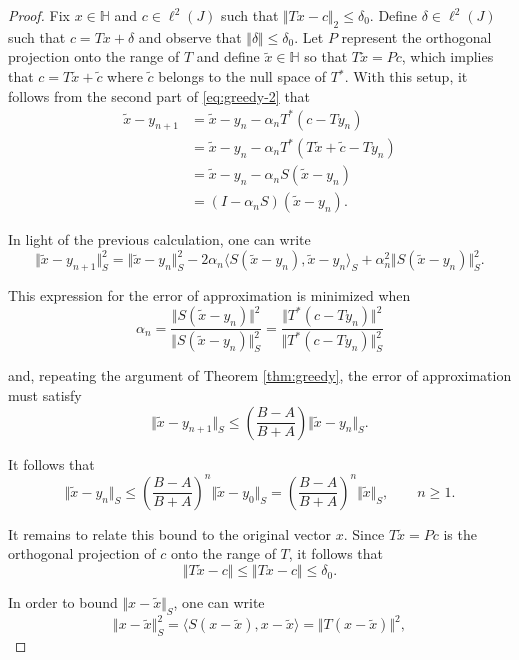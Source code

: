 \documentclass[10pt,a4paper]{amsart}
\begin{document}
\begin{proof}
Fix $x\in \mathbb{H}$ and $c\in \ell^{2}(J)$ such that $\Vert Tx-c\Vert_{2} \le \delta_{0}$.  Define $\delta \in \ell^{2}(J)$ such that $c = Tx + \delta$ and observe that $\Vert \delta\Vert \le \delta_{0}$.  Let $P$ represent the orthogonal projection onto the range of $T$ and define $\tilde{x} \in \mathbb{H}$ so that $T\tilde{x}=Pc$, which implies that $c = T\tilde{x} + \tilde{c}$ where $\tilde{c}$ belongs to the null space of $T{^*}$.  With this setup, it follows from the second part of \eqref{eq:greedy-2} that
$$ \begin{aligned} 
    \tilde{x} - y_{n+1} &= \tilde{x} - y_{n} - \alpha_{n} T^{*}(c-T y_{n}) \\
                        &= \tilde{x} - y_{n} - \alpha_{n} T^{*}(T\tilde{x} + \tilde{c} - T y_{n}) \\
                        &= \tilde{x} - y_{n} - \alpha_{n} S(\tilde{x}-y_{n}) \\
                        &= (I-\alpha_{n}S) (\tilde{x}-y_{n}). 
    \end{aligned} $$

\noindent
In light of the previous calculation, one can write
$$ \Vert \tilde{x}-y_{n+1} \Vert_{S}^{2} = \Vert \tilde{x}-y_{n} \Vert_{S}^{2} - 2\alpha_{n} \langle S(\tilde{x}-y_{n}),\tilde{x}-y_{n}\rangle_{S} + \alpha_{n}^{2} \Vert S(\tilde{x}-y_{n}) \Vert_{S}^{2}. $$

\noindent
This expression for the error of approximation is minimized when
$$ \alpha_{n} = \frac{\Vert S(\tilde{x}-y_{n})\Vert^{2}}{\Vert S(\tilde{x}-y_{n})\Vert_{S}^{2}} = \frac{\Vert T^{*}(c-Ty_{n})\Vert^{2}}{\Vert T^{*}(c-Ty_{n})\Vert_{S}^{2}}$$

\noindent
and, repeating the argument of Theorem \ref{thm:greedy}, the error of approximation must satisfy
$$ \Vert \tilde{x}-y_{n+1} \Vert_{S} \le \left ( \frac{B-A}{B+A} \right ) \Vert \tilde{x}-y_{n} \Vert_{S}.$$

\noindent
It follows that
$$ \Vert \tilde{x}-y_{n} \Vert_{S} \le \left ( \frac{B-A}{B+A} \right )^{n} \Vert \tilde{x}-y_{0} \Vert_{S} = \left ( \frac{B-A}{B+A} \right )^{n} \Vert \tilde{x} \Vert_{S}, \qquad n \ge 1.$$

\noindent
It remains to relate this bound to the original vector $x$.  Since $T\tilde{x}=Pc$ is the orthogonal projection of $c$ onto the range of $T$, it follows that
$$ \Vert T\tilde{x} - c \Vert \le \Vert Tx - c \Vert \le \delta_{0}. $$

\noindent
In order to bound $\Vert x-\tilde{x}\Vert_{S}$, one can write
$$ \Vert x-\tilde{x} \Vert_{S}^{2} = \langle  S(x-\tilde{x}),  x-\tilde{x} \rangle = \Vert T(x-\tilde{x})\Vert^{2}, $$


\end{proof}
\end{document}
